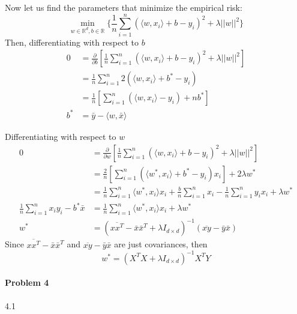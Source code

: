 \documentclass[12pt]{report}
\begin{document}
Now let us find the parameters that minimize the empirical risk:
$$ \min_{w \in \mathbb{R}^{d}, b \in \mathbb{R}} \{ \frac{1}{n} \sum^{n}_{i=1}(\langle w, x_{i}\rangle +b - y_{i})^{2} + \lambda \lvert\lvert w \rvert\rvert^{2} \} $$
Then, differentiating with respect to $b$
\begin{equation}
  \begin{aligned}
    0 & = \frac{\partial}{\partial b} \left[\frac{1}{n} \sum^{n}_{i=1}(\langle w, x_{i}\rangle +b - y_{i})^{2} + \lambda \lvert\lvert w \rvert\rvert^{2} \right] \\
    & = \frac{1}{n} \sum^{n}_{i=1} 2(\langle w, x_{i} \rangle + b^{*} - y_{i} ) \\
    & = \frac{1}{n} \left[\sum^{n}_{i=1} (\langle w, x_{i} \rangle - y_{i} ) + nb^{*} \right] \\
    b^{*} & = \bar{y} - \langle w, \bar{x} \rangle  
  \end{aligned}
\end{equation}

Differentiating with respect to $w$
\begin{equation}
  \begin{aligned}
    0 & = \frac{\partial}{\partial w} \left[\frac{1}{n} \sum^{n}_{i=1}(\langle w, x_{i}\rangle +b - y_{i})^{2} + \lambda \lvert\lvert w \rvert\rvert^{2} \right] \\
    & = \frac{2}{n} \left[\sum^{n}_{i=1} (\langle w^{*}, x_{i} \rangle + b^{*} - y_{i} )x_{i} \right] + 2\lambda w^{*} \\
    & = \frac{1}{n} \sum^{n}_{i=1} \langle w^{*}, x_{i} \rangle x_{i} + \frac{b}{n}\sum^{n}_{i=1} x_{i} -\frac{1}{n} \sum^{n}_{i=1} y_{i} x_{i} + \lambda w^{*} \\
    \frac{1}{n}\sum^{n}_{i=1}x_{i} y_{i} - b^{*}\bar{x} & = \frac{1}{n} \sum^{n}_{i=1} \langle w^{*}, x_{i} \rangle x_{i} + \lambda w^{*} \\ 
    w^{*} & = (\overline{xx^{T}} - \bar{x} \bar{x}^{T} + \lambda I_{d \times d} )^{-1}(\overline{xy} - \bar{y}\bar{x})
  \end{aligned}
\end{equation}
Since $\overline{xx^{T}} - \bar{x} \bar{x}^{T}$ and $\overline{xy} - \bar{y}\bar{x}$ are just covariances, then
$$ w^{*} = (X^{T}X + \lambda I_{d \times d})^{-1} X^{T}Y$$


\paragraph{Problem 4}  
4.1
\end{document}
